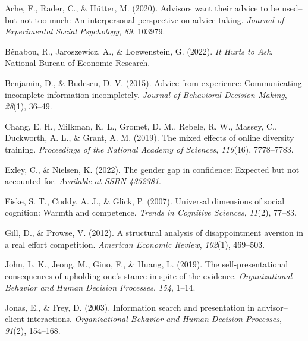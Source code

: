 \documentclass[
  man,floatsintext]{apa6}
\newlength{\cslhangindent}
\newlength{\cslentryspacingunit} %
\newenvironment{CSLReferences}[2] %
 {%
  \setlength{\parindent}{0pt}
  \ifodd #1
  \let\oldpar\par
  \def\par{\hangindent=\cslhangindent\oldpar}
  \fi
  \setlength{\parskip}{#2\cslentryspacingunit}
 }%
 {}
\begin{document}
\begingroup
\singlespacing
\setlength{\parindent}{-0.2in}
\setlength{\leftskip}{0.2in}
\noindent

\hypertarget{refs}{}
\begin{CSLReferences}{1}{0}
\leavevmode{}%
Ache, F., Rader, C., \& Hütter, M. (2020). Advisors want their advice to be used--but not too much: {An} interpersonal perspective on advice taking. \emph{Journal of Experimental Social Psychology}, \emph{89}, 103979.

\leavevmode{}%
Bénabou, R., Jaroszewicz, A., \& Loewenstein, G. (2022). \emph{It {Hurts} to {Ask}}. National Bureau of Economic Research.

\leavevmode{}%
Benjamin, D., \& Budescu, D. V. (2015). Advice from experience: {Communicating} incomplete information incompletely. \emph{Journal of Behavioral Decision Making}, \emph{28}(1), 36--49.

\leavevmode{}%
Chang, E. H., Milkman, K. L., Gromet, D. M., Rebele, R. W., Massey, C., Duckworth, A. L., \& Grant, A. M. (2019). The mixed effects of online diversity training. \emph{Proceedings of the National Academy of Sciences}, \emph{116}(16), 7778--7783.

\leavevmode{}%
Exley, C., \& Nielsen, K. (2022). The gender gap in confidence: {Expected} but not accounted for. \emph{Available at SSRN 4352381}.

\leavevmode{}%
Fiske, S. T., Cuddy, A. J., \& Glick, P. (2007). Universal dimensions of social cognition: Warmth and competence. \emph{Trends in Cognitive Sciences}, \emph{11}(2), 77--83.

\leavevmode{}%
Gill, D., \& Prowse, V. (2012). A structural analysis of disappointment aversion in a real effort competition. \emph{American Economic Review}, \emph{102}(1), 469--503.

\leavevmode{}%
John, L. K., Jeong, M., Gino, F., \& Huang, L. (2019). The self-presentational consequences of upholding one's stance in spite of the evidence. \emph{Organizational Behavior and Human Decision Processes}, \emph{154}, 1--14.

\leavevmode{}%
Jonas, E., \& Frey, D. (2003). Information search and presentation in advisor--client interactions. \emph{Organizational Behavior and Human Decision Processes}, \emph{91}(2), 154--168.


\end{CSLReferences}
\end{document}
